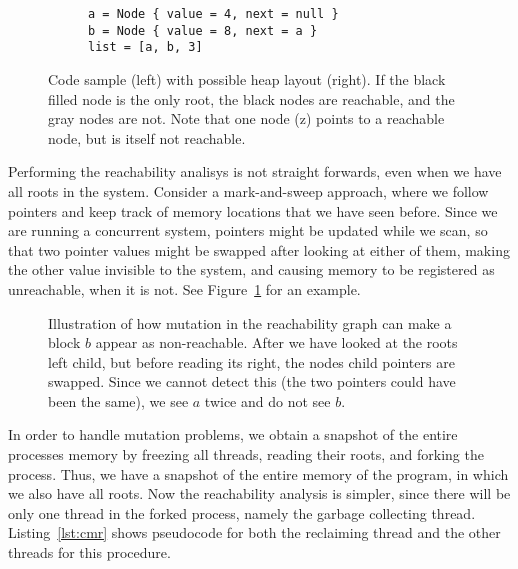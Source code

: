 \begin{figure}[ht]
  \centering
  \begin{subfigure}{0.45\textwidth}
    \begin{lstlisting}
a = Node { value = 4, next = null }
b = Node { value = 8, next = a }
list = [a, b, 3]
    \end{lstlisting}
  \end{subfigure}
  \hfill
  \begin{subfigure}{0.45\textwidth}
    
  \end{subfigure}
  \caption{Code sample (left) with possible heap layout (right). If the black filled node is the
  only root, the black nodes are reachable, and the gray nodes are not. Note that one node (z)
  points to a reachable node, but is itself not reachable.}
\end{figure}

Performing the reachability analisys is not straight forwards, even when we have all roots in the
system. Consider a mark-and-sweep approach, where we follow pointers and keep track of memory
locations that we have seen before. Since we are running a concurrent system, pointers might be
updated while we scan, so that two pointer values might be swapped after looking at either of them,
making the other value invisible to the system, and causing memory to be registered as unreachable,
when it is not. See Figure~\ref{fig:pointer-swap} for an example.

\begin{figure}[ht]
  \centering
  
  \caption{Illustration of how mutation in the reachability graph can make a block $b$ appear as
  non-reachable. After we have looked at the roots left child, but before reading its right, the
  nodes child pointers are swapped. Since we cannot detect this (the two pointers could have been
  the same), we see $a$ twice and do not see $b$.\label{fig:pointer-swap}}
\end{figure}

In order to handle mutation problems, we obtain a snapshot of the entire processes memory by
freezing all threads, reading their roots, and forking the process. Thus, we have a snapshot of
the entire memory of the program, in which we also have all roots. Now the reachability analysis is
simpler, since there will be only one thread in the forked process, namely the garbage collecting
thread. Listing~\ref{lst:cmr} shows pseudocode for both the reclaiming thread and the other threads
for this procedure.

